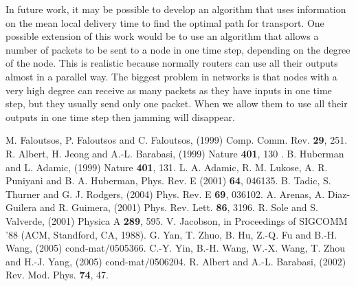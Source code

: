 \documentclass[runningheads]{llncs}
\begin{document}
In future work, it may be possible to develop an algorithm that uses
information on the mean local delivery time to find the optimal path
for transport. One possible extension of this work would be to use
an algorithm that allows a number of packets to be sent to a node in
one time step, depending on the degree of the node. This is
realistic because normally routers can use all their outputs almost
in a parallel way. The biggest problem in networks is that nodes
with a very high degree can receive as many packets as they have
inputs in one time step, but they usually send only one packet. When
we allow them to use all their outputs in one time step then jamming
will disappear.

\begin{thebibliography}{11}
M. Faloutsos, P. Faloutsos and C. Faloutsos, (1999) Comp. Comm. Rev.
{\bf 29}, 251.
R. Albert, H. Jeong and A.-L. Barabasi, (1999) Nature {\bf 401}, 130
.
B. Huberman and L. Adamic, (1999) Nature {\bf 401}, 131.
L. A. Adamic, R. M. Lukose, A. R. Puniyani and B. A. Huberman,
Phys. Rev. E (2001) {\bf 64}, 046135.
B. Tadic, S. Thurner and G. J. Rodgers, (2004) Phys. Rev. E {\bf 69},
036102.
A. Arenas, A. Diaz-Guilera and R. Guimera, (2001) Phys. Rev.
Lett. {\bf 86}, 3196.
R. Sole and S. Valverde, (2001) Physica A {\bf 289}, 595.
V. Jacobson, in Proceedings of SIGCOMM '88 (ACM, Standford, CA,
1988).
G. Yan, T. Zhuo, B. Hu, Z.-Q. Fu and B.-H. Wang, (2005)
cond-mat/0505366.
C.-Y. Yin, B.-H. Wang, W.-X. Wang, T. Zhou and H.-J. Yang, (2005)
cond-mat/0506204.
R. Albert and A.-L. Barabasi, (2002) Rev. Mod. Phys. {\bf
74}, 47.


\end{thebibliography}
\end{document}
